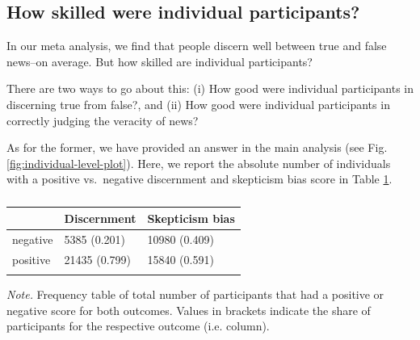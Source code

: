 \documentclass[
  man]{apa6}
\begin{document}
\subsection{How skilled were individual participants?}\label{how-skilled-were-individual-participants}

In our meta analysis, we find that people discern well between true and false news--on average. But how skilled are individual participants?

There are two ways to go about this: (i) How good were individual participants in discerning true from false?, and (ii) How good were individual participants in correctly judging the veracity of news?

As for the former, we have provided an answer in the main analysis (see Fig. \ref{fig:individual-level-plot}). Here, we report the absolute number of individuals with a positive vs.~negative discernment and skepticism bias score in Table \ref{tab:individuals-direction}.

\begin{table}[tbp]

\begin{center}
\begin{threeparttable}

\caption{\label{tab:individuals-direction}}

\begin{tabular}{lll}
\toprule
 & \multicolumn{1}{c}{Discernment} & \multicolumn{1}{c}{Skepticism  bias}\\
\midrule
negative & 5385 (0.201) & 10980 (0.409)\\
positive & 21435 (0.799) & 15840 (0.591)\\
\bottomrule
\addlinespace
\end{tabular}

\begin{tablenotes}[para]
\normalsize{\textit{Note.} Frequency table of total number of participants that had a positive or negative score for both outcomes. Values in brackets indicate the share of participants for the respective outcome (i.e. column).}
\end{tablenotes}

\end{threeparttable}
\end{center}

\end{table}
\end{document}
